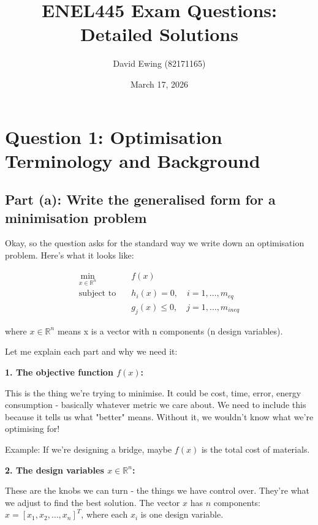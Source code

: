 \documentclass[11pt]{article}
\title{ENEL445 Exam Questions: Detailed Solutions}
\author{David Ewing (82171165)}
\date{March 17, 2026}
\begin{document}
\maketitle

\section{Question 1: Optimisation Terminology and Background}

\subsection{Part (a): Write the generalised form for a minimisation problem}

Okay, so the question asks for the standard way we write down an optimisation problem. Here's what it looks like:

\vspace{1em}
\begin{framed}
\begin{align*}
\min_{x \in \mathbb{R}^n} \quad & f(x) \\
\text{subject to} \quad & h_i(x) = 0, \quad i = 1, \ldots, m_{eq} \\
& g_j(x) \leq 0, \quad j = 1, \ldots, m_{ineq}
\end{align*}
\end{framed}

where $x \in \mathbb{R}^n$ means x is a vector with n components (n design variables).

\vspace{1em}

Let me explain each part and why we need it:

\textbf{1. The objective function $f(x)$:}

This is the thing we're trying to minimise. It could be cost, time, error, energy consumption - basically whatever metric we care about. We need to include this because it tells us what "better" means. Without it, we wouldn't know what we're optimising for!

Example: If we're designing a bridge, maybe $f(x)$ is the total cost of materials.

\vspace{0.5em}

\textbf{2. The design variables $x \in \mathbb{R}^n$:}

These are the knobs we can turn - the things we have control over. They're what we adjust to find the best solution. The vector $x$ has $n$ components: $x = [x_1, x_2, \ldots, x_n]^T$, where each $x_i$ is one design variable.
\end{document}

